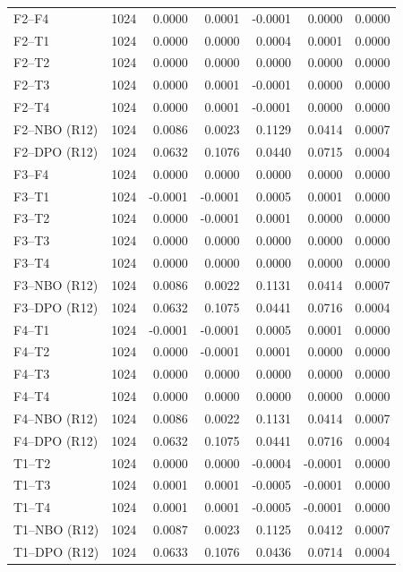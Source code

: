 \begin{longtable}{lrrrrrr}
F2--F4 & 1024 & 0.0000 & 0.0001 & -0.0001 & 0.0000 & 0.0000 \\
F2--T1 & 1024 & 0.0000 & 0.0000 & 0.0004 & 0.0001 & 0.0000 \\
F2--T2 & 1024 & 0.0000 & 0.0000 & 0.0000 & 0.0000 & 0.0000 \\
F2--T3 & 1024 & 0.0000 & 0.0001 & -0.0001 & 0.0000 & 0.0000 \\
F2--T4 & 1024 & 0.0000 & 0.0001 & -0.0001 & 0.0000 & 0.0000 \\
F2--NBO (R12) & 1024 & 0.0086 & 0.0023 & 0.1129 & 0.0414 & 0.0007 \\
F2--DPO (R12) & 1024 & 0.0632 & 0.1076 & 0.0440 & 0.0715 & 0.0004 \\
F3--F4 & 1024 & 0.0000 & 0.0000 & 0.0000 & 0.0000 & 0.0000 \\
F3--T1 & 1024 & -0.0001 & -0.0001 & 0.0005 & 0.0001 & 0.0000 \\
F3--T2 & 1024 & 0.0000 & -0.0001 & 0.0001 & 0.0000 & 0.0000 \\
F3--T3 & 1024 & 0.0000 & 0.0000 & 0.0000 & 0.0000 & 0.0000 \\
F3--T4 & 1024 & 0.0000 & 0.0000 & 0.0000 & 0.0000 & 0.0000 \\
F3--NBO (R12) & 1024 & 0.0086 & 0.0022 & 0.1131 & 0.0414 & 0.0007 \\
F3--DPO (R12) & 1024 & 0.0632 & 0.1075 & 0.0441 & 0.0716 & 0.0004 \\
F4--T1 & 1024 & -0.0001 & -0.0001 & 0.0005 & 0.0001 & 0.0000 \\
F4--T2 & 1024 & 0.0000 & -0.0001 & 0.0001 & 0.0000 & 0.0000 \\
F4--T3 & 1024 & 0.0000 & 0.0000 & 0.0000 & 0.0000 & 0.0000 \\
F4--T4 & 1024 & 0.0000 & 0.0000 & 0.0000 & 0.0000 & 0.0000 \\
F4--NBO (R12) & 1024 & 0.0086 & 0.0022 & 0.1131 & 0.0414 & 0.0007 \\
F4--DPO (R12) & 1024 & 0.0632 & 0.1075 & 0.0441 & 0.0716 & 0.0004 \\
T1--T2 & 1024 & 0.0000 & 0.0000 & -0.0004 & -0.0001 & 0.0000 \\
T1--T3 & 1024 & 0.0001 & 0.0001 & -0.0005 & -0.0001 & 0.0000 \\
T1--T4 & 1024 & 0.0001 & 0.0001 & -0.0005 & -0.0001 & 0.0000 \\
T1--NBO (R12) & 1024 & 0.0087 & 0.0023 & 0.1125 & 0.0412 & 0.0007 \\
T1--DPO (R12) & 1024 & 0.0633 & 0.1076 & 0.0436 & 0.0714 & 0.0004 \\

\end{longtable}
